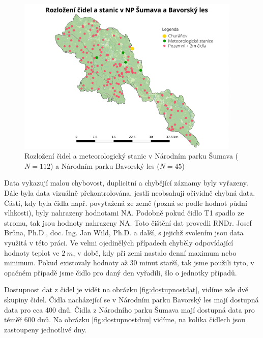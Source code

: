 \begin{figure}
	\centering
	\includegraphics[width=0.95\textwidth]{img/rozlozenicidel.pdf}
	\caption{Rozložení čidel a meteorologický stanic v Národním parku Šumava ($N=112$) a Národním parku Bavorský les ($N=45$)}
	\label{fig:rozlozenicidel}
\end{figure}

Data vykazují malou chybovost, duplicitní a chybějící záznamy byly vyřazeny. Dále byla data vizuálně překontrolována, jestli neobsahují očividně chybná data. Části, kdy byla čidla např. povytažená ze země (pozná se podle hodnot půdní vlhkosti), byly nahrazeny hodnotami NA. Podobně pokud čidlo T1 spadlo ze stromu, tak jsou hodnoty nahrazeny NA. Toto čištění dat provedli RNDr. Josef Brůna, Ph.D., doc. Ing. Jan Wild, Ph.D. a další, s jejichž svolením jsou data využitá v této práci. Ve velmi ojedinělých případech chyběly odpovídající hodnoty teplot ve $\SI{2}{m}$, v době, kdy při zemi nastalo denní maximum nebo minimum. Pokud existovaly hodnoty až 30 minut starší, tak jsme použili tyto, v opačném případě jsme čidlo pro daný den vyřadili, šlo o jednotky případů.

Dostupnost dat z čidel je vidět na obrázku \ref{fig:dostupnostdat}, vidíme zde dvě skupiny čidel. Čidla nacházející se v Národním parku Bavorský les mají dostupná data pro cca 400 dnů. Čidla z Národního parku Šumava mají dostupná data pro téměř 600 dnů. Na obrázku \ref{fig:dostupnostdnu} vidíme, na kolika čidlech jsou zastoupeny jednotlivé dny.

